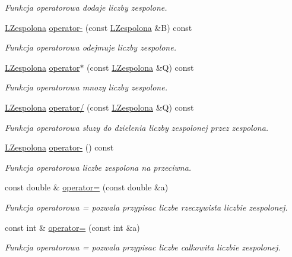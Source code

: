 \begin{DoxyCompactItemize}
\begin{DoxyCompactList}\small\item\em Funkcja operatorowa dodaje liczby zespolone. \item\end{DoxyCompactList}\item 
\hyperlink{class_l_zespolona}{LZespolona} \hyperlink{class_l_zespolona_ad3875fdfa4e365029281d3dd0588dd68}{operator-\/} (const \hyperlink{class_l_zespolona}{LZespolona} \&B) const 
\begin{DoxyCompactList}\small\item\em Funkcja operatorowa odejmuje liczby zespolone. \item\end{DoxyCompactList}\item 
\hyperlink{class_l_zespolona}{LZespolona} \hyperlink{class_l_zespolona_a778727af986d4b8cddcbd089c6083644}{operator$\ast$} (const \hyperlink{class_l_zespolona}{LZespolona} \&Q) const 
\begin{DoxyCompactList}\small\item\em Funkcja operatorowa mnozy liczby zespolone. \item\end{DoxyCompactList}\item 
\hyperlink{class_l_zespolona}{LZespolona} \hyperlink{class_l_zespolona_aea67f672eb082a069c394f2aa832c65e}{operator/} (const \hyperlink{class_l_zespolona}{LZespolona} \&Q) const 
\begin{DoxyCompactList}\small\item\em Funkcja operatorowa sluzy do dzielenia liczby zespolonej przez zespolona. \item\end{DoxyCompactList}\item 
\hyperlink{class_l_zespolona}{LZespolona} \hyperlink{class_l_zespolona_a35b451d6d3bd0b0782bb1a73517e7f04}{operator-\/} () const 
\begin{DoxyCompactList}\small\item\em Funkcja operatorowa liczbe zespolona na przeciwna. \item\end{DoxyCompactList}\item 
const double \& \hyperlink{class_l_zespolona_aad1062d600b75272470a7b6e0b627000}{operator=} (const double \&a)
\begin{DoxyCompactList}\small\item\em Funkcja operatorowa = pozwala przypisac liczbe rzeczywista liczbie zespolonej. \item\end{DoxyCompactList}\item 
const int \& \hyperlink{class_l_zespolona_a1956d27ba5a7c68dd4e8adba81db23da}{operator=} (const int \&a)
\begin{DoxyCompactList}\small\item\em Funkcja operatorowa = pozwala przypisac liczbe calkowita liczbie zespolonej. \item\end{DoxyCompactList}\end{DoxyCompactItemize}
